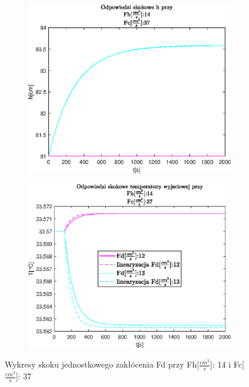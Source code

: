 \begin{figure}[h!]
   \centering
   \begin{subfigure}[b]{0.4\textwidth}
      \includegraphics[width=1\linewidth]{img/small-step-responses-fd/stepResponseHFhFd.eps}
      \caption{}
      \label{fig:fig:stepResponsesFhFd1}
   \end{subfigure}
       
   \begin{subfigure}[b]{0.4\textwidth}
      \includegraphics[width=1\linewidth]{img/small-step-responses-fd/stepResponseToutFhFd.eps}
      \caption{}
      \label{fig:fig:stepResponsesFhFd2}
   \end{subfigure}
       
   \caption{Wykresy skoku jednostkowego zakłócenia Fd przy Fh[$\frac{cm^3}{s}$]: 14 i  Fc[$\frac{cm^3}{s}$]: 37}
   \label{fig:stepResponsesFhFd}
\end{figure}
           
